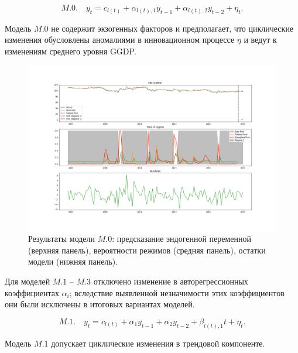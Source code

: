 \documentclass[a4paper,14pt]{extreport}
\begin{document}
\begin{equation}
	M.0. \quad y_t = c_{l(t)} + \alpha_{l(t), 1} y_{t-1} + \alpha_{l(t), 2} y_{t-2} + \eta_t .
\end{equation}

Модель $M.0$ не содержит экзогенных факторов и предполагает, что циклические изменения обусловлены аномалиями в инновационном процессе $\eta$ и ведут к изменениям среднего уровня GGDP.

\begin{figure}[H]
	\includegraphics[width=\linewidth]{img/manual/model_m0.png}
	\caption{
		Результаты модели $M.0$: предсказание эндогенной переменной (верхняя панель), вероятности режимов (средняя панель), остатки модели (нижняя панель).
	}
	\label{fig:sm_model_m0}
\end{figure}

Для моделей $M.1$ -- $M.3$ отключено изменение в авторегрессионных коэффициентах $\alpha_i$; вследствие выявленной незначимости этих коэффициентов они были исключены в итоговых вариантах моделей.

\begin{equation}	
	M.1. \quad y_t = c_{l(t)} + \alpha_1 y_{t-1} + \alpha_2 y_{t-2} + \beta_{l(t), 1} t + \eta_t .
\end{equation}

Модель $M.1$ допускает циклические изменения в трендовой компоненте. 
\end{document}
